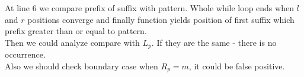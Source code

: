 \documentclass{article}
\begin{document}
At line 6 we compare prefix of suffix with pattern. Whole while loop ends when
$l$ and $r$ positions converge and finally function yields position of first
suffix which prefix greater than or equal to pattern.\\

Then we could analyze compare with $L_p$. If they are the same - there is no
occurrence.\\

Also we should check boundary case when $R_p = m$, it could be false positive.


\end{document}

